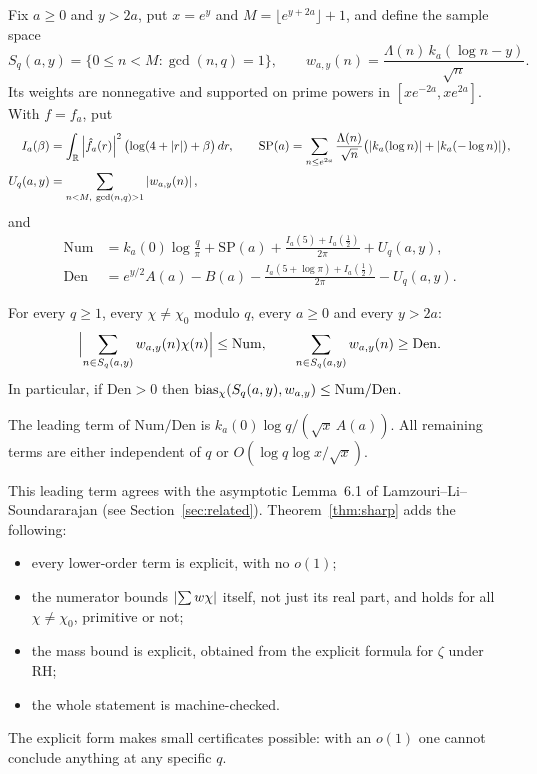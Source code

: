 Fix $a\ge0$ and $y>2a$, put $x=e^y$ and $M=\lfloor e^{y+2a}\rfloor+1$, and define the sample space
\[
  S_q(a,y)=\{0\le n<M:\gcd(n,q)=1\},\qquad w_{a,y}(n)=\frac{\Lambda(n)\,k_a(\log n-y)}{\sqrt n}.
\]
Its weights are nonnegative and supported on prime powers in $[xe^{-2a},xe^{2a}]$. With $f=f_a$, put
\begin{align*}
  I_a(\beta)&=\int_{\mathbb{R}}\left\lvert \hat f_a(r) \right\rvert^2\bigl(\log(4+\left\lvert r \right\rvert)+\beta\bigr)\,dr,\qquad
  \mathrm{SP}(a)=\sum_{n\le e^{2a}}\frac{\Lambda(n)}{\sqrt n}\bigl(\left\lvert k_a(\log n) \right\rvert+\left\lvert k_a(-\log n) \right\rvert\bigr),\\
  U_q(a,y)&=\sum_{n<M,\ \gcd(n,q)>1}\left\lvert w_{a,y}(n) \right\rvert ,
\end{align*}
and
\begin{align*}
  \mathrm{Num}&=k_a(0)\log\tfrac q\pi+\mathrm{SP}(a)+\frac{I_a(5)+I_a(\frac12)}{2\pi}+U_q(a,y),\\
  \mathrm{Den}&=e^{y/2}A(a)-B(a)-\frac{I_a(5+\log\pi)+I_a(\frac12)}{2\pi}-U_q(a,y).
\end{align*}

\begin{theorem}\label{thm:sharp}
For every $q\ge1$, every $\chi\ne\chi_0$ modulo $q$, every $a\ge0$ and every $y>2a$:
\[
  \Bigl\lvert\sum_{n\in S_q(a,y)}w_{a,y}(n)\chi(n)\Bigr\rvert\le\mathrm{Num},\qquad
  \sum_{n\in S_q(a,y)}w_{a,y}(n)\ge\mathrm{Den}.
\]
In particular, if $\mathrm{Den}>0$ then $\operatorname{bias}_\chi(S_q(a,y),w_{a,y})\le\mathrm{Num}/\mathrm{Den}$.
\end{theorem}

The leading term of $\mathrm{Num}/\mathrm{Den}$ is $k_a(0)\log q/(\sqrt x\,A(a))$. All remaining terms are
either independent of $q$ or $O(\log q\log x/\sqrt x)$.

\begin{remark}
This leading term agrees with the asymptotic Lemma~6.1 of Lamzouri--Li--Soundararajan \cite{lls2015} (see
Section~\ref{sec:related}). Theorem~\ref{thm:sharp} adds the following:
\begin{itemize}
\item every lower-order term is explicit, with no $o(1)$;
\item the numerator bounds $\left\lvert \sum w\chi \right\rvert$ itself, not just its real part, and holds for all $\chi\ne\chi_0$, primitive or not;
\item the mass bound is explicit, obtained from the explicit formula for $\zeta$ under RH;
\item the whole statement is machine-checked.
\end{itemize}
The explicit form makes small certificates possible: with an $o(1)$ one cannot conclude anything at any specific $q$.
\end{remark}

